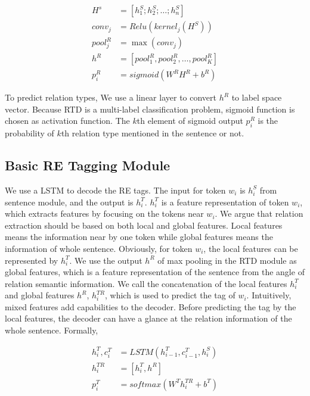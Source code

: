 \begin{align*}
  H^s &= [h_1^S; h_2^S; \ldots; h_n^S] \nonumber \\
  conv_j &= Relu(kernel_j(H^S)) \nonumber \\
  pool_j^R &= \max(conv_j) \nonumber \\
  h^R &= [pool_1^R, pool_2^R, \ldots, pool_K^R] \nonumber \\
  p_i^R &= sigmoid(W^RH^R + b^R) \nonumber
\end{align*}

To predict relation types, We use a linear layer to convert $h^R$ to label space
vector. Because RTD is a multi-label classification problem, sigmoid function is
chosen as activation function. 
The $k$th element of sigmoid output $p_i^R$ is the
probability of $k$th relation type mentioned in the sentence or not.


\subsection{Basic RE Tagging Module}

We use a LSTM to decode the RE tags. The input for 
token $w_i$ is  $h_i^S$ from sentence module, and the output is $h_i^T$. 
$h_i^T$ is a feature representation of token $w_i$, which extracts features by
focusing on the tokens near $w_i$. 
We argue that relation extraction should be based on 
both local and global features. Local features means the
information near by one token while global features means the information of
whole sentence. Obviously, for token $w_i$, the local features can be
represented by $h_i^T$. We use the output $h^R$ of max pooling in the RTD module
as global features, which is a feature representation of the sentence from 
the angle of relation semantic information. 
We call the concatenation of the local features
$h_i^T$ and global features $h^R$,  $h_i^{TR}$, which is used to
predict the tag of $w_i$. Intuitively, mixed features add capabilities to
the decoder. Before predicting the tag by the local features, the decoder can
have a glance at the relation information of the whole sentence. Formally,

\begin{align*}
  h_i^T, c_i^T &= LSTM(h_{i-1}^T, c_{i-1}^T, h_i^S) \nonumber \\
  h_i^{TR} &= [h_i^T, h^R] \nonumber \\
  p_i^T &= softmax(W^Th_i^{TR} + b^T) \nonumber
\end{align*}

